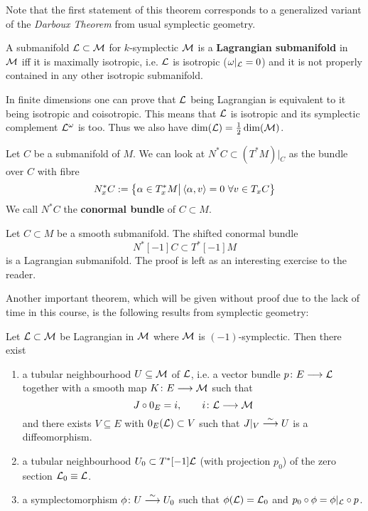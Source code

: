 Note that the first statement of this theorem corresponds to a generalized variant of the \emph{Darboux Theorem} from usual symplectic geometry.

\begin{definition}
  A submanifold $\mathcal{L} \subset \mathcal{M}$ for $k$-symplectic $\mathcal{M}$ is a \textbf{Lagrangian submanifold} in $\mathcal{M}$ iff it is maximally isotropic, i.e. $\mathcal{L}$ is isotropic ($\omega|_{\mathcal{L}} = 0$) and it is not properly contained in any other isotropic submanifold.
\end{definition}

In finite dimensions one can prove that $\mathcal{L}$ being Lagrangian is equivalent to it being isotropic and coisotropic. This means that $\mathcal{L}$ is isotropic and its symplectic complement $\mathcal{L}^\omega$ is too. Thus we also have $\dim(\mathcal{L}) = \frac{1}{2} \dim(\mathcal{M})$.

\begin{definition}
  Let $C$ be a submanifold of $M$. We can look at $ N^* C \subset (T^*M)|_C $ as the bundle over $C$ with fibre
  $$ N_x^* C := \left \{ \alpha \in T_x^*M \big| \left\langle \alpha , v \right\rangle = 0 \ \forall v \in T_x C \right\} $$
  We call $N^* C$ the \textbf{conormal bundle} of $C \subset M$.
\end{definition}

\begin{example}
  Let $C \subset M$ be a smooth submanifold. The shifted conormal bundle
  $$ N^*[-1]C \subset T^*[-1]M $$
  is a Lagrangian submanifold. The proof is left as an interesting exercise to the reader.
\end{example}

Another important theorem, which will be given without proof due to the lack of time in this course, is the following results from symplectic geometry:

\begin{theo}
  Let $\mathcal{L} \subset \mathcal{M}$ be Lagrangian in $\mathcal{M}$ where $\mathcal{M}$ is $(-1)$-symplectic. Then there exist
  \begin{enumerate}
    \item a tubular neighbourhood $U \subseteq \mathcal{M}$ of $\mathcal{L}$, i.e. a vector bundle $p \colon E \longrightarrow \mathcal{L}$ together with a smooth map $K \colon E \longrightarrow \mathcal{M}$ such that
    $$ J \circ 0_E = i, \quad \quad i \colon \mathcal{L} \longrightarrow \mathcal{M} $$
    and there exists $V \subseteq E$ with $0_E(\mathcal{L}) \subset V$ such that $J|_V \overset{\sim}{\longrightarrow} U$ is a diffeomorphism.

    \item a tubular neighbourhood $U_0 \subset T^*[-1] \mathcal{L}$ (with projection $p_0$) of the zero section $\mathcal{L}_0 \equiv \mathcal{L}$.

    \item a symplectomorphism $\phi \colon U \atob{\sim} U_0$ such that $\phi(\LL) = \LL_0$ and $p_0 \circ \phi = \phi|_\LL \circ p$.
  \end{enumerate}
\end{theo}

